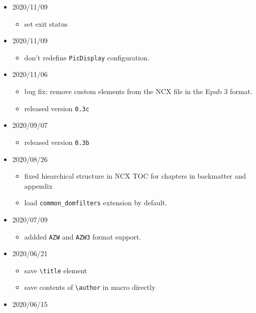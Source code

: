 \begin{itemize}
  \begin{itemize}
  \tightlist
  \item
    added more examples of configuration to the documentation.
  \end{itemize}
\item
  2020/11/09

  \begin{itemize}
  \tightlist
  \item
    set exit status
  \end{itemize}
\item
  2020/11/09

  \begin{itemize}
  \tightlist
  \item
    don't redefine \texttt{PicDisplay} configuration.
  \end{itemize}
\item
  2020/11/06

  \begin{itemize}
  \tightlist
  \item
    bug fix: remove custom elements from the NCX file in the Epub 3
    format.
  \item
    released version \texttt{0.3c}
  \end{itemize}
\item
  2020/09/07

  \begin{itemize}
  \tightlist
  \item
    released version \texttt{0.3b}
  \end{itemize}
\item
  2020/08/26

  \begin{itemize}
  \tightlist
  \item
    fixed hiearchical structure in NCX TOC for chapters in backmatter
    and appendix
  \item
    load \texttt{common\_domfilters} extension by default.
  \end{itemize}
\item
  2020/07/09

  \begin{itemize}
  \tightlist
  \item
    addded \texttt{AZW} and \texttt{AZW3} format support.
  \end{itemize}
\item
  2020/06/21

  \begin{itemize}
  \tightlist
  \item
    save \texttt{\textbackslash{}title} element
  \item
    save contents of \texttt{\textbackslash{}author} in macro directly
  \end{itemize}
\item
  2020/06/15


\end{itemize}
